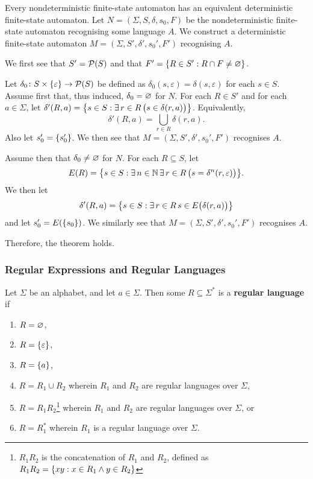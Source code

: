 \Bth
    Every nondeterministic finite-state automaton has an equivalent
    deterministic finite-state automaton.
\Eth
\Bpr
    Let \(N = (\varSigma, S, \delta, s_0, F)\) be the nondeterministic
    finite-state automaton recognising some language \(A\). We construct a
    deterministic finite-state automaton \(M = (\varSigma, S', \delta', s_0',
    F')\) recognising \(A\).

    We first see that \(S' = \pow(S)\) and that \(F' = \set{R \in S' : R \cap F
    \neq \nset}\).

    Let \(\map{\delta_0}{S \times \set{\varepsilon}}{\pow(S)}\) be defined as
    \(\delta_0(s, \varepsilon) = \delta(s, \varepsilon)\) for each \(s \in S\).
    Assume first that, thus induced, \(\delta_0 = \nset\) for \(N\). For each
    \(R \in S'\) and for each \(a \in \varSigma\), let \(\delta'(R, a) = \set*{s
    \in S : \exists \, r \in R \, \big(s \in \delta(r, a)\big)}\). Equivalently,
    \[
        \delta'(R, a) = \bigcup_{r \in R} \delta(r, a).
    \]
    Also let \(s_0' = \set{s_0'}\). We then see that \(M = (\varSigma, S',
    \delta', s_0', F')\) recognises \(A\).

    Assume then that \(\delta_0 \neq \nset\) for \(N\). For each \(R \subseteq S
    \), let
    \[
        E(R) = \set*{s \in S : \exists \, n \in \setnat \, \exists \, r \in R \,
        \big(s = \delta^n(r, \varepsilon)\big)}.
    \]
    We then let
    \[
        \delta'(R, a) = \set*{s \in S : \exists \, r \in R \, s \in
        E\big(\delta(r, a)\big)}
    \]
    and let \(s_0' = E(\set{s_0})\). We similarly see that \(M = (\varSigma, S',
    \delta', s_0', F')\) recognises \(A\).

    Therefore, the theorem holds.
\Epr

\subsubsection{Regular Expressions and Regular Languages}

\Bdf
    Let \(\varSigma\) be an alphabet, and let \(a \in \varSigma\). Then some \(R
    \subseteq \varSigma^*\) is a {\bf regular language} if
    \begin{enumerate}
        \item \(R = \nset\),
        \item \(R = \set{\varepsilon}\),
        \item \(R = \set{a}\),
        \item \(R = R_1 \cup R_2\) wherein \(R_1\) and \(R_2\) are regular
        languages over \(\varSigma\),
        \item \(R = R_1 R_2\)\footnote{\(R_1 R_2\) is the concatenation of
        \(R_1\) and \(R_2\), defined as \(R_1 R_2 = \set{x y : x \in R_1 \land y
        \in R_2}\)} wherein \(R_1\) and \(R_2\) are regular languages over
        \(\varSigma\), or
        \item \(R = R_1^*\) wherein \(R_1\) is a regular language over
        \(\varSigma\).
    \end{enumerate}
\Edf

